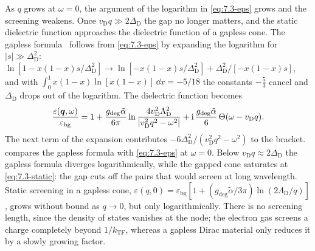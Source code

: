 As $q$ grows at $\omega = 0$, the argument of the logarithm in \cref{eq:7.3-eps} grows and the screening weakens. Once $v_{\mathrm{D}}q \gg 2\Delta_{\mathrm{D}}$ the gap no longer matters, and the static dielectric function approaches the dielectric function of a gapless cone.
The gapless formula~\cite[Eq.~(2.7)]{hochberg2018detection} follows from \cref{eq:7.3-eps} by expanding the logarithm for $|s| \gg \Delta_{\mathrm{D}}^2$: $\ln[1 - x(1 - x)s/\Delta_{\mathrm{D}}^2] \to \ln[-x(1 - x)s/\Delta_{\mathrm{D}}^2] + \Delta_{\mathrm{D}}^2/[-x(1 - x)s]$, and with $\int_0^1x(1 - x)\ln[x(1 - x)]\,\dd x = -5/18$ the constants $-\frac53$ cancel and $\Delta_{\mathrm{D}}$ drops out of the logarithm. The dielectric function becomes
\begin{equation}
  \frac{\varepsilon(\bm{q},\omega)}{\varepsilon_{\mathrm{bg}}} = 1 + \frac{g_{\mathrm{deg}}\tilde\alpha}{6\pi}\ln\frac{4v_{\mathrm{D}}^2\Lambda_{\mathrm{D}}^2}{|v_{\mathrm{D}}^2q^2 - \omega^2|} + \mathrm{i}\,\frac{g_{\mathrm{deg}}\tilde\alpha}{6}\,\Theta(\omega - v_{\mathrm{D}}q) .
  \label{eq:D.22-gapless}
\end{equation}
The next term of the expansion contributes $-6\Delta_{\mathrm{D}}^2/(v_{\mathrm{D}}^2q^2 - \omega^2)$ to the bracket.  compares the gapless formula with \cref{eq:7.3-eps} at $\omega = 0$. Below $v_{\mathrm{D}}q \approx 2\Delta_{\mathrm{D}}$ the gapless formula diverges logarithmically, while the gapped cone saturates at \cref{eq:7.3-static}: the gap cuts off the pairs that would screen at long wavelength. Static screening in a gapless cone, $\varepsilon(q,0) = \varepsilon_{\mathrm{bg}}[1 + (g_{\mathrm{deg}}\tilde\alpha/3\pi)\ln(2\Lambda_{\mathrm{D}}/q)]$, grows without bound as $q \to 0$, but only logarithmically. There is no screening length, since the density of states vanishes at the node; the electron gas screens a charge completely beyond $1/k_{\mathrm{TF}}$, whereas a gapless Dirac material only reduces it by a slowly growing factor.

